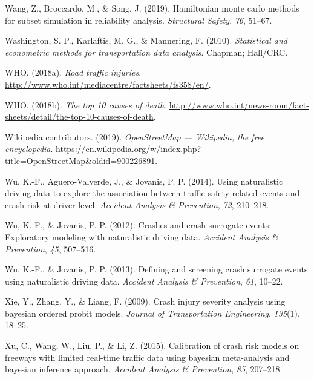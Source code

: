 \documentclass[12pt]{book}
\numberwithin{equation}{chapter}
\begin{document}
\leavevmode\hypertarget{ref-wang2019hamiltonian}{}%
Wang, Z., Broccardo, M., \& Song, J. (2019). Hamiltonian monte carlo methods for subset simulation in reliability analysis. \emph{Structural Safety}, \emph{76}, 51--67.

\leavevmode\hypertarget{ref-washington2010statistical}{}%
Washington, S. P., Karlaftis, M. G., \& Mannering, F. (2010). \emph{Statistical and econometric methods for transportation data analysis}. Chapman; Hall/CRC.

\leavevmode\hypertarget{ref-who2018b}{}%
WHO. (2018a). \emph{Road traffic injuries}. \url{http://www.who.int/mediacentre/factsheets/fs358/en/}.

\leavevmode\hypertarget{ref-who2018}{}%
WHO. (2018b). \emph{The top 10 causes of death}. \url{http://www.who.int/news-room/fact-sheets/detail/the-top-10-causes-of-death}.

\leavevmode\hypertarget{ref-wikiOSM}{}%
Wikipedia contributors. (2019). \emph{OpenStreetMap --- Wikipedia, the free encyclopedia}. \url{https://en.wikipedia.org/w/index.php?title=OpenStreetMap\&oldid=900226891}.

\leavevmode\hypertarget{ref-wu2014using}{}%
Wu, K.-F., Aguero-Valverde, J., \& Jovanis, P. P. (2014). Using naturalistic driving data to explore the association between traffic safety-related events and crash risk at driver level. \emph{Accident Analysis \& Prevention}, \emph{72}, 210--218.

\leavevmode\hypertarget{ref-wu2012crashes}{}%
Wu, K.-F., \& Jovanis, P. P. (2012). Crashes and crash-surrogate events: Exploratory modeling with naturalistic driving data. \emph{Accident Analysis \& Prevention}, \emph{45}, 507--516.

\leavevmode\hypertarget{ref-wu2013defining}{}%
Wu, K.-F., \& Jovanis, P. P. (2013). Defining and screening crash surrogate events using naturalistic driving data. \emph{Accident Analysis \& Prevention}, \emph{61}, 10--22.

\leavevmode\hypertarget{ref-xie2009crash}{}%
Xie, Y., Zhang, Y., \& Liang, F. (2009). Crash injury severity analysis using bayesian ordered probit models. \emph{Journal of Transportation Engineering}, \emph{135}(1), 18--25.

\leavevmode\hypertarget{ref-xu2015calibration}{}%
Xu, C., Wang, W., Liu, P., \& Li, Z. (2015). Calibration of crash risk models on freeways with limited real-time traffic data using bayesian meta-analysis and bayesian inference approach. \emph{Accident Analysis \& Prevention}, \emph{85}, 207--218.
\end{document}
